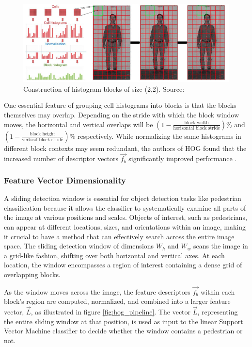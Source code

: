 \begin{figure}
    \centering
    \includegraphics[width=0.75\linewidth]{images/normalisation.png}
    \caption{Construction of histogram blocks of size (2,2). Source: \cite{shidlovskiy_2020_reducing}}
    \label{fig:normalisation}
\end{figure}

One essential feature of grouping cell histograms into blocks is that the blocks themselves may overlap. Depending on the stride with which the block window moves, the horizontal and vertical overlaps will be $(1-\frac{\text{block width}}{\text{horizontal block stride}})\%$ and $(1-\frac{\text{block height}}{\text{vertical block stride}})\%$ respectively. While normalizing the same histograms in different block contexts may seem redundant, the authors of HOG found that the increased number of descriptor vectors $\vec{f_b}$ significantly improved performance \cite{dalal_2005_histograms}.


\subsubsection{Feature Vector Dimensionality}\label{sec:feature_vector_dimensionality}

A sliding detection window is essential for object detection tasks like pedestrian classification because it allows the classifier to systematically examine all parts of the image at various positions and scales. Objects of interest, such as pedestrians, can appear at different locations, sizes, and orientations within an image, making it crucial to have a method that can effectively search across the entire image space. The sliding detection window of dimensions  $W_h$ and $W_w$ scans the image in a grid-like fashion, shifting over both horizontal and vertical axes. At each location, the window encompasses a region of interest containing a dense grid of overlapping blocks.

As the window moves across the image, the feature descriptors $\vec{f_b}$ within each block's region are computed, normalized, and combined into a larger feature vector, $\vec{L}$, as illustrated in figure \ref{fig:hog_pipeline}. The vector $\vec{L}$, representing the entire sliding window at that position, is used as input to the linear Support Vector Machine classifier to decide whether the window contains a pedestrian or not. 

